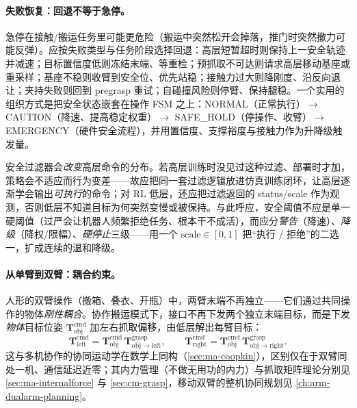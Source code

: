 \paragraph{失败恢复：回退不等于急停。}
急停在接触/搬运任务里可能更危险（搬运中突然松开会掉落，推门时突然撤力可能反弹）。应按失败类型与任务阶段选择回退：高层短暂超时则保持上一安全轨迹并减速；目标置信度低则冻结末端、等重检；预抓取不可达则请求高层移动基座或重采样；基座不稳则收臂到安全位、优先站稳；接触力过大则降刚度、沿反向退让；夹持失败则回到 pregrasp 重试；自碰撞风险则停臂、保持腿稳。一个实用的组织方式是把安全状态嵌套在操作 FSM 之上：NORMAL（正常执行）$\to$ CAUTION（降速、提高稳定权重）$\to$ SAFE\_HOLD（停操作、收臂）$\to$ EMERGENCY（硬件安全流程），并用置信度、支撑裕度与接触力作为升降级触发量。

\begin{insight}
安全过滤器会\emph{改变}高层命令的分布。若高层训练时没见过这种过滤、部署时才加，策略会不适应而行为变差——故应把同一套过滤逻辑放进仿真训练闭环，让高层逐渐学会输出\emph{可执行}的命令；对 RL 低层，还应把过滤返回的 status/scale 作为观测，否则低层不知道目标为何突然变慢或被保持。与此呼应，安全阈值不应是单一硬阈值（过严会让机器人频繁拒绝任务、根本干不成活），而应分\emph{警告}（降速）、\emph{降级}（降权/限幅）、\emph{硬停止}三级——用一个 $\mathrm{scale}\in[0,1]$ 把“执行 / 拒绝”的二选一，扩成连续的温和降级。
\end{insight}

\paragraph{从单臂到双臂：耦合约束。}
人形的双臂操作（搬箱、叠衣、开瓶）中，两臂末端不再独立——它们通过共同操作的物体\emph{刚性耦合}。协作搬运模式下，接口不再下发两个独立末端目标，而是下发\emph{物体}目标位姿 $\mathbf{T}_{\mathrm{obj}}^{\mathrm{cmd}}$ 加左右抓取偏移，由低层解出每臂目标：
\begin{equation}
  \mathbf{T}_{\mathrm{left}}^{\mathrm{cmd}}=\mathbf{T}_{\mathrm{obj}}^{\mathrm{cmd}}\,\mathbf{T}_{\mathrm{obj}\to\mathrm{left}}^{\mathrm{grasp}},\qquad
  \mathbf{T}_{\mathrm{right}}^{\mathrm{cmd}}=\mathbf{T}_{\mathrm{obj}}^{\mathrm{cmd}}\,\mathbf{T}_{\mathrm{obj}\to\mathrm{right}}^{\mathrm{grasp}}.
  \label{eq:si-bimanual}
\end{equation}
这与多机协作的协同运动学在数学上同构（\cref{sec:ma-coopkin}），区别仅在于双臂同处一机、通信延迟近零；其内力管理（不做无用功的内力）与抓取矩阵理论分别见 \cref{sec:ma-internalforce} 与 \cref{sec:cm-grasp}，移动双臂的整机协同规划见 \cref{ch:arm-dualarm-planning}。

